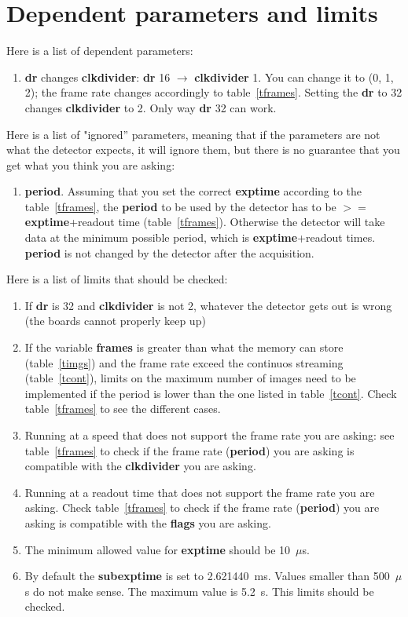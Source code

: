 \documentclass{article}
\begin{document}
{{{\section{Dependent parameters and limits}
Here is a list of dependent parameters:
\begin{enumerate}
\item \textbf{dr} changes \textbf{clkdivider}: \textbf{dr} 16 $\to$  \textbf{clkdivider} 1. You can change it to (0, 1, 2); the frame rate changes accordingly to table~\ref{tframes}. Setting the \textbf{dr} to 32 changes \textbf{clkdivider} to 2. Only way  \textbf{dr} 32 can work. 
\end{enumerate}

Here is a list of "ignored'' parameters, meaning that if the parameters are not what the detector expects, it will ignore them, but there is no guarantee that you get what you think you are asking: 
\begin{enumerate}
\item \textbf{period}. Assuming that you set the correct \textbf{exptime} according to the table~\ref{tframes}, the \textbf{period} to be used by the detector has to be $>=$ \textbf{exptime}+readout time (table~\ref{tframes}). Otherwise the detector will take data at the minimum possible period, which is \textbf{exptime}+readout times. \textbf{period} is not changed by the detector after the acquisition. 
\end{enumerate}

Here is a list of limits that should be checked:
\begin{enumerate}
\item 
If \textbf{dr} is 32 and \textbf{clkdivider} is not 2, whatever the detector gets out is wrong (the boards cannot properly keep up) 
\item If the variable \textbf{frames} is greater than what the memory can store (table~\ref{timgs}) and the frame rate exceed the continuos streaming (table~\ref{tcont}), limits on the maximum number of images need to be implemented if the period is lower than the one listed in table~\ref{tcont}. Check table~\ref{tframes} to see the different cases.
\item Running at a speed that does not support the frame rate you are asking: see table~\ref{tframes} to check if the frame rate (\textbf{period}) you are asking is compatible with the \textbf{clkdivider} you are asking.
\item Running at a readout time that does not support the frame rate you are asking. Check table~\ref{tframes} to check if the frame rate (\textbf{period}) you are asking is compatible with the \textbf{flags} you are asking.
\item The minimum allowed value for \textbf{exptime} should be 10~$\mu$s. 
\item By default the {\textbf{subexptime}} is set to 2.621440~ms. Values smaller than 500~$\mu$s do not make sense. The maximum value is 5.2~s. This limits should be checked.
\end{enumerate}

}}}
\end{document}
